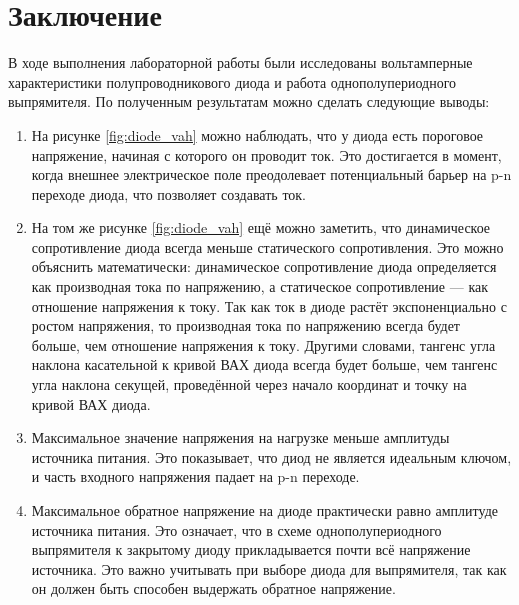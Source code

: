 \section{Заключение}

В ходе выполнения лабораторной работы были исследованы вольтамперные характеристики полупроводникового диода и работа однополупериодного выпрямителя. По полученным результатам можно сделать следующие выводы:
\begin{enumerate}
    \item На рисунке \ref{fig:diode_vah} можно наблюдать, что у диода есть пороговое напряжение, начиная с которого он проводит ток. Это достигается в момент, когда внешнее электрическое поле преодолевает потенциальный барьер на p-n переходе диода, что позволяет создавать ток.
    \item На том же рисунке \ref{fig:diode_vah} ещё можно заметить, что динамическое сопротивление диода всегда меньше статического сопротивления. Это можно объяснить математически: динамическое сопротивление диода определяется как производная тока по напряжению, а статическое сопротивление --- как отношение напряжения к току. Так как ток в диоде растёт экспоненциально с ростом напряжения, то производная тока по напряжению всегда будет больше, чем отношение напряжения к току. Другими словами, тангенс угла наклона касательной к кривой ВАХ диода всегда будет больше, чем тангенс угла наклона секущей, проведённой через начало координат и точку на кривой ВАХ диода.
    \item Максимальное значение напряжения на нагрузке меньше амплитуды источника питания. Это показывает, что диод не является идеальным ключом, и часть входного напряжения падает на p-n переходе.
    \item Максимальное обратное напряжение на диоде практически равно амплитуде источника питания. Это означает, что в схеме однополупериодного выпрямителя к закрытому диоду прикладывается почти всё напряжение источника. Это важно учитывать при выборе диода для выпрямителя, так как он должен быть способен выдержать обратное напряжение.  
\end{enumerate}